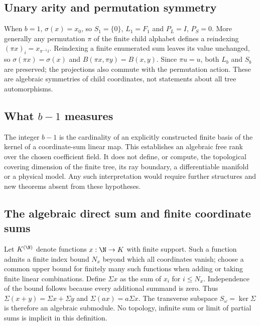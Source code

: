 \subsection{Unary arity and permutation symmetry}\label{supp:8-8}
\par{}\par\smallskip

When $b=1$, $\sigma(x)=x_0$, so $S_1=\{0\}$, $L_1=F_1$ and $P_L=I$, $P_S=0$. More generally any permutation $\pi$ of the finite child alphabet defines a reindexing $(\pi x)_i=x_{\pi^{-1}i}$. Reindexing a finite enumerated sum leaves its value unchanged, so $\sigma(\pi x)=\sigma(x)$ and $B(\pi x,\pi y)=B(x,y)$. Since $\pi u=u$, both $L_b$ and $S_b$ are preserved; the projections also commute with the permutation action. These are algebraic symmetries of child coordinates, not statements about all tree automorphisms.

\subsection{What $b-1$ measures}\label{supp:8-9}
\par{}\par\smallskip

The integer $b-1$ is the cardinality of an explicitly constructed finite basis of the kernel of a coordinate-sum linear map. This establishes an algebraic free rank over the chosen coefficient field. It does not define, or compute, the topological covering dimension of the finite tree, its ray boundary, a differentiable manifold or a physical model. Any such interpretation would require further structures and new theorems absent from these hypotheses.

\subsection{The algebraic direct sum and finite coordinate sums}\label{supp:9-1}
\par{}\par\smallskip

Let $K^{(\N)}$ denote functions $x:\N\to K$ with finite support. Such a function admits a finite index bound $N_x$ beyond which all coordinates vanish; choose a common upper bound for finitely many such functions when adding or taking finite linear combinations. Define $\Sigma x$ as the sum of $x_i$ for $i\le N_x$. Independence of the bound follows because every additional summand is zero. Thus $\Sigma(x+y)=\Sigma x+\Sigma y$ and $\Sigma(ax)=a\Sigma x$. The transverse subspace $S_\omega=\ker\Sigma$ is therefore an algebraic submodule. No topology, infinite sum or limit of partial sums is implicit in this definition.

